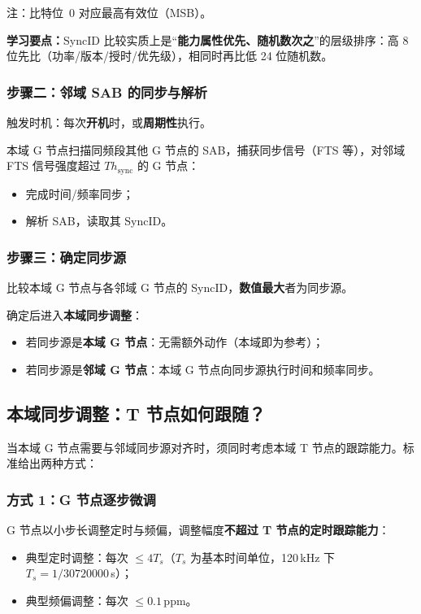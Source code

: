 \documentclass[11pt,a4paper]{ctexart}
\newcommand{\learn}[1]{\par\noindent\textcolor{blue!70!black}{\textbf{学习要点：}#1}\par}
\begin{document}
注：比特位~0 对应最高有效位（MSB）。

\learn{SyncID 比较实质上是“\textbf{能力属性优先、随机数次之}”的层级排序：高 8 位先比（功率/版本/授时/优先级），相同时再比低 24 位随机数。}

\subsubsection{步骤二：邻域 SAB 的同步与解析}

触发时机：每次\textbf{开机}时，或\textbf{周期性}执行。

本域 G 节点扫描同频段其他 G 节点的 SAB，捕获同步信号（FTS 等），对邻域 FTS 信号强度超过 $Th_{\mathrm{sync}}$ 的 G 节点：
\begin{itemize}
  \item 完成时间/频率同步；
  \item 解析 SAB，读取其 SyncID。
\end{itemize}

\subsubsection{步骤三：确定同步源}

比较本域 G 节点与各邻域 G 节点的 SyncID，\textbf{数值最大}者为同步源。

确定后进入\textbf{本域同步调整}：
\begin{itemize}
  \item 若同步源是\textbf{本域 G 节点}：无需额外动作（本域即为参考）；
  \item 若同步源是\textbf{邻域 G 节点}：本域 G 节点向同步源执行时间和频率同步。
\end{itemize}

\subsection{本域同步调整：T 节点如何跟随？}

当本域 G 节点需要与邻域同步源对齐时，须同时考虑本域 T 节点的跟踪能力。标准给出两种方式：

\subsubsection{方式 1：G 节点逐步微调}

G 节点以小步长调整定时与频偏，调整幅度\textbf{不超过 T 节点的定时跟踪能力}：
\begin{itemize}
  \item 典型定时调整：每次 $\le 4T_s$（$T_s$ 为基本时间单位，120\,kHz 下 $T_s=1/30720000$\,s）；
  \item 典型频偏调整：每次 $\le 0.1$\,ppm。
\end{itemize}
\end{document}
